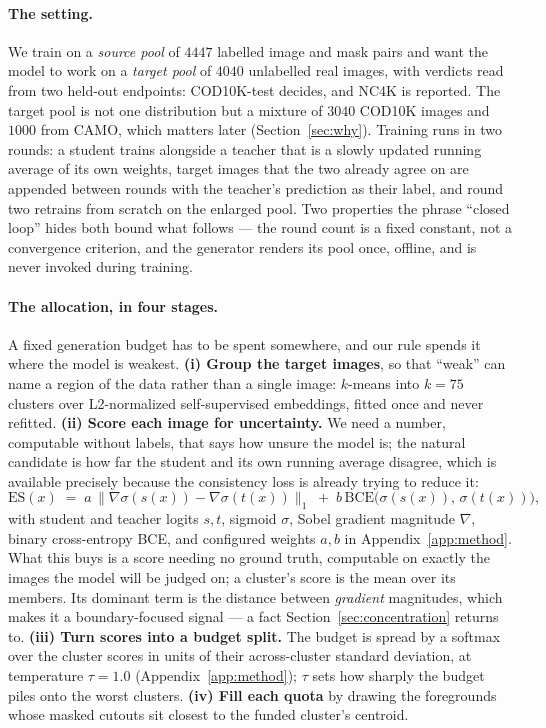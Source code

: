 \documentclass{article}
\newcommand{\atemp}{\tau}
\begin{document}
\paragraph{The setting.} We train on a \emph{source pool} of $4447$ labelled image and mask pairs
and want the model to work on a \emph{target pool} of $4040$ unlabelled real images, with verdicts
read from two held-out endpoints: COD10K-test decides, and NC4K is reported. The target pool is not
one distribution but a mixture of $3040$ COD10K images and $1000$ from CAMO, which matters later
(Section~\ref{sec:why}). Training runs in two rounds: a student trains alongside a teacher that is a slowly updated running
average of its own weights, target images that the two already agree on are appended between rounds with
the teacher's prediction as their label, and round two retrains from scratch on the enlarged pool.
Two properties the phrase ``closed loop'' hides both bound what follows --- the round count is a
fixed constant, not a convergence criterion, and the generator renders its pool once, offline, and
is never invoked during training.

\paragraph{The allocation, in four stages.} A fixed generation budget has to be spent somewhere, and our rule spends it where the model is weakest. \textbf{(i) Group the target images}, so that
``weak'' can name a region of the data rather than a single image: $k$-means into $k = 75$ clusters
over L2-normalized self-supervised embeddings, fitted once and never refitted. \textbf{(ii) Score
each image for uncertainty.} We need a number, computable without labels, that says how unsure the model is; the natural candidate is how far the student and its own running average disagree, which
is available precisely because the consistency loss is already trying to reduce it:
\begin{equation}
\mathrm{ES}(x) \;=\; a \,\big\| \nabla \sigma(s(x)) - \nabla \sigma(t(x)) \big\|_{1}
\;+\; b \, \mathrm{BCE}\big( \sigma(s(x)),\, \sigma(t(x)) \big),
\label{eq:es}
\end{equation}
with student and teacher logits $s,t$, sigmoid $\sigma$, Sobel gradient magnitude $\nabla$, binary
cross-entropy BCE, and
configured weights $a, b$ in Appendix~\ref{app:method}. What this buys is a score needing no ground
truth, computable on exactly the images the model will be judged on; a cluster's score is the mean
over its members. Its dominant term is the distance between \emph{gradient} magnitudes, which makes it a boundary-focused signal --- a fact Section~\ref{sec:concentration} returns to. \textbf{(iii) Turn scores into a budget split.} The budget is spread by a softmax over the cluster scores in units of their across-cluster standard deviation, at temperature $\atemp = 1.0$ (Appendix~\ref{app:method}); $\atemp$ sets how sharply the
budget piles onto the worst clusters.
\textbf{(iv) Fill each quota} by drawing the foregrounds whose masked cutouts sit closest to the
funded cluster's centroid.
\end{document}
